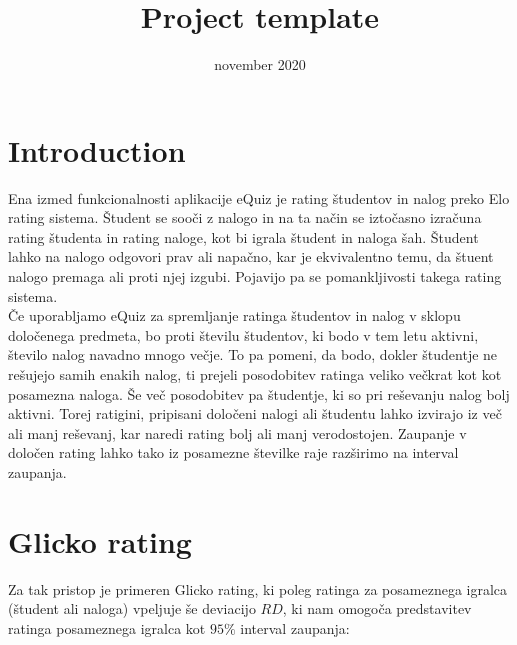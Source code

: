 \documentclass{IEEEtran}
\title{Project template}
\date{november 2020}
\begin{document}
\maketitle

\section{Introduction}
\label{sec:intro}
Ena izmed funkcionalnosti aplikacije eQuiz %
je rating študentov in nalog preko Elo rating sistema. Študent se sooči z nalogo in na ta način se iztočasno izračuna rating študenta in rating naloge, kot bi igrala študent in naloga šah. Študent lahko na nalogo odgovori prav ali napačno, kar je ekvivalentno temu, da štuent nalogo premaga ali proti njej izgubi. 
Pojavijo pa se pomankljivosti takega rating sistema. 
\hfill
\\
Če uporabljamo eQuiz za spremljanje ratinga študentov in nalog v sklopu določenega predmeta, bo proti številu študentov, ki bodo v tem letu aktivni, število nalog navadno mnogo večje. To pa pomeni, da bodo, dokler študentje ne rešujejo samih enakih nalog, ti prejeli posodobitev ratinga veliko večkrat kot kot posamezna naloga. Še več posodobitev pa študentje, ki so pri reševanju nalog bolj aktivni.
Torej ratigini, pripisani določeni nalogi ali študentu lahko izvirajo iz več ali manj reševanj, kar naredi rating bolj ali manj verodostojen.
Zaupanje v določen rating lahko tako iz posamezne številke raje razširimo na interval zaupanja.
\section{Glicko rating}
\label{sec:glicko}
Za tak pristop je primeren Glicko %
rating, ki poleg ratinga za posameznega igralca (študent ali naloga) vpeljuje še deviacijo $RD$, ki nam omogoča predstavitev ratinga posameznega igralca kot $95\%$ interval zaupanja:
\end{document}
